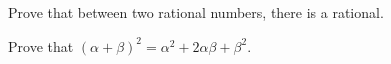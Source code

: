 \begin{exercise}
\item Prove that between two rational numbers, there is a rational.
\item Prove that $(\alpha + \beta)^2 = \alpha^2 + 2 \alpha \beta + \beta^2$.
\end{exercise}
